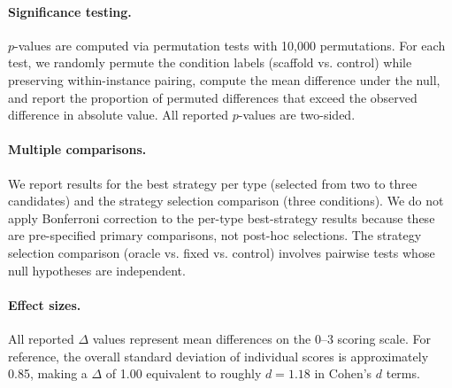 \documentclass[11pt]{article}
\begin{document}
\paragraph{Significance testing.}
$p$-values are computed via permutation tests with 10,000 permutations.
For each test, we randomly permute the condition labels (scaffold vs. control) while preserving within-instance pairing, compute the mean difference under the null, and report the proportion of permuted differences that exceed the observed difference in absolute value.
All reported $p$-values are two-sided.

\paragraph{Multiple comparisons.}
We report results for the best strategy per type (selected from two to three candidates) and the strategy selection comparison (three conditions).
We do not apply Bonferroni correction to the per-type best-strategy results because these are pre-specified primary comparisons, not post-hoc selections.
The strategy selection comparison (oracle vs. fixed vs. control) involves pairwise tests whose null hypotheses are independent.

\paragraph{Effect sizes.}
All reported $\Delta$ values represent mean differences on the 0--3 scoring scale.
For reference, the overall standard deviation of individual scores is approximately 0.85, making a $\Delta$ of 1.00 equivalent to roughly $d=1.18$ in Cohen's $d$ terms.
\end{document}
